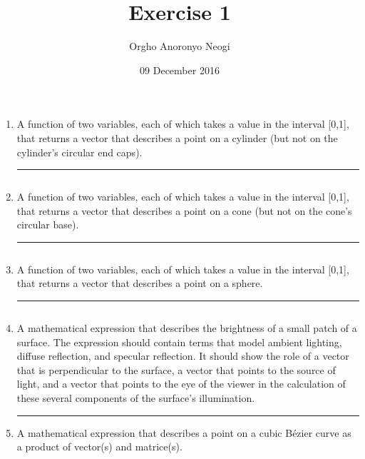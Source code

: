 \documentclass[oneside]{article}
\title{Exercise 1}
\author{Orgho Anoronyo Neogi}
\date{09 December 2016}
\newenvironment{answer}
  {\vspace*{0.2cm} \rule{12cm}{0.02cm} \vspace*{0.2cm}}
  {\vspace*{0.2cm}}
\begin{document}
\maketitle

\begin{enumerate}
	\item A function of two variables, each of which takes a value in the interval [0,1], that returns a vector that describes a point on a cylinder (but not on the cylinder's circular end caps).

	      \begin{answer}
	      	\inputminted[firstline=1, lastline=9]{js}{exercise-1.js}
	      \end{answer}

	\item A function of two variables, each of which takes a value in the interval [0,1], that returns a vector that describes a point on a cone (but not on the cone's circular base).

	      \begin{answer}
	      	\inputminted[firstline=11, lastline=19]{js}{exercise-1.js}
	      \end{answer}

	\item A function of two variables, each of which takes a value in the interval [0,1], that returns a vector that describes a point on a sphere.

	      \begin{answer}
	      	\inputminted[firstline=21, lastline=29]{js}{exercise-1.js}
	      \end{answer}

	\item A mathematical expression that describes the brightness of a small patch of a surface. The expression should contain terms that model ambient lighting, diffuse reflection, and specular reflection. It should show the role of a vector that is perpendicular to the surface, a vector that points to the source of light, and a vector that points to the eye of the viewer in the calculation of these several components of the surface's illumination.

	      \begin{answer}

	      \end{answer}

	\item A mathematical expression that describes a point on a cubic B\'{e}zier curve as a product of vector(s) and matrice(s).


\end{enumerate}
\end{document}
